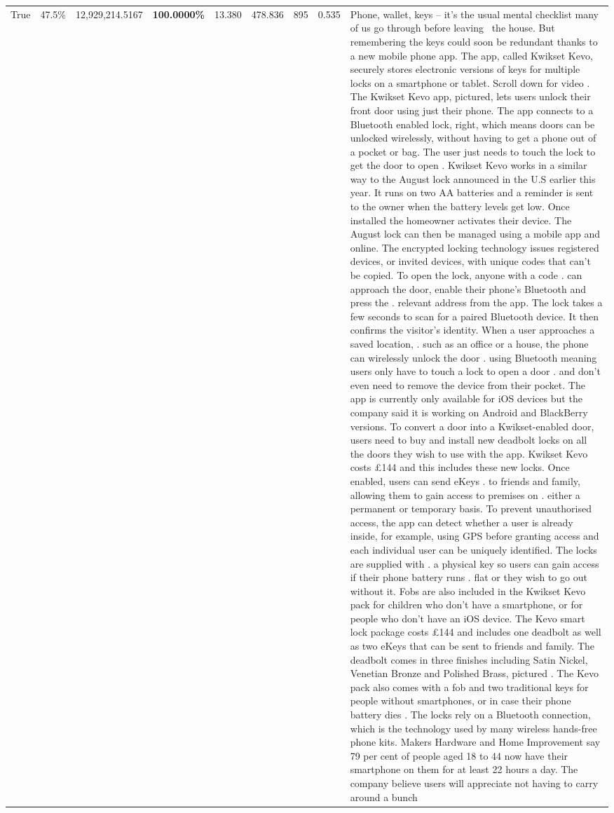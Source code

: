 \begin{table}[H]
\begin{tabular}{lllrlllll}
True & 47.5\% & 12,929,214.5167 & \bfseries \color{red} 100.0000\% & 13.380 & 478.836 & 895 & 0.535 & Phone, wallet, keys – it’s the usual mental checklist many of us go through before leaving  the house. But remembering the keys could soon be redundant thanks to a new mobile phone app. The app, called Kwikset Kevo, securely stores electronic versions of keys for multiple locks on a smartphone or tablet. Scroll down for video . The Kwikset Kevo app, pictured, lets users unlock their front door using just their phone. The app connects to a Bluetooth enabled lock, right, which means doors can be unlocked wirelessly, without having to get a phone out of a pocket or bag. The user just needs to touch the lock to get the door to open . Kwikset Kevo works in a similar way to the August lock announced in the U.S earlier this year. It runs on two AA batteries and a reminder is sent to the owner when the battery levels get low. Once installed the homeowner activates their device. The August lock can then be managed using a mobile app and online. The encrypted locking technology issues registered devices, or invited devices, with unique codes that can't be copied. To open the lock, anyone with a code . can approach the door, enable their phone's Bluetooth and press the . relevant address from the app. The lock takes a few seconds to scan for a paired Bluetooth device. It then confirms the visitor's identity. When a user approaches a saved location, . such as an office or a house, the phone can wirelessly unlock the door . using Bluetooth meaning users only have to touch a lock to open a door . and don't even need to remove the device from their pocket. The app is currently only available for iOS devices but the company said it is working on Android and BlackBerry versions. To convert a door into a Kwikset-enabled door, users need to buy and install new deadbolt locks on all the doors they wish to use with the app. Kwikset Kevo costs £144 and this includes these new locks. Once enabled, users can send eKeys . to friends and family, allowing them to gain access to premises on . either a permanent or temporary basis. To prevent unauthorised access, the app can detect whether a user is already inside, for example, using GPS before granting access and each individual user can be uniquely identified. The locks are supplied with . a physical key so users can gain access if their phone battery runs . flat or they wish to go out without it. Fobs are also included in the Kwikset Kevo pack for children who don't have a smartphone, or for people who don't have an iOS device. The Kevo smart lock package costs £144 and includes one deadbolt as well as two eKeys that can be sent to friends and family. The deadbolt comes in three finishes including Satin Nickel, Venetian Bronze and Polished Brass, pictured . The Kevo pack also comes with a fob and two traditional keys for people without smartphones, or in case their phone battery dies . The locks rely on a Bluetooth connection, which is the technology used by many wireless hands-free phone kits. Makers Hardware and Home Improvement say 79 per cent of people aged 18 to 44 now have their smartphone on them for at least 22 hours a day. The company believe users will appreciate not having to carry around a bunch 
\end{tabular}
\end{table}
